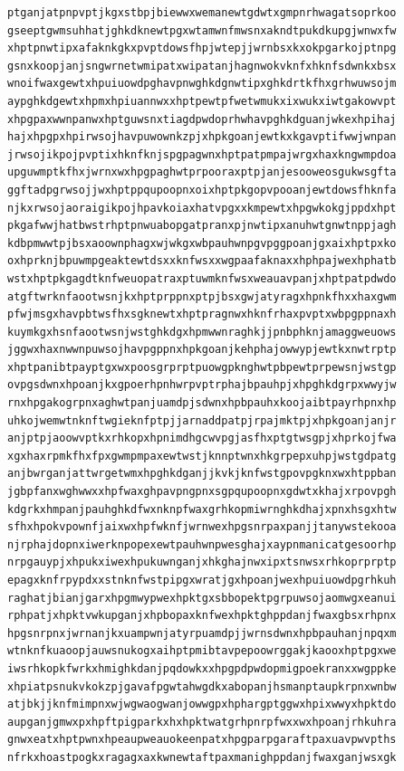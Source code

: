 \documentclass[11pt,letterpaper]{exam}
\begin{document}
\begin{questions}
\begin{verbatim}
ptganjatpnpvptjkgxstbpjbiewwxwemanewtgdwtxgmpnrhwagatsoprkoo
gseeptgwmsuhhatjghkdknewtpgxwtamwnfmwsnxakndtpukdkupgjwnwxfw
xhptpnwtipxafaknkgkxpvptdowsfhpjwtepjjwrnbsxkxokpgarkojptnpg
gsnxkoopjanjsngwrnetwmipatxwipatanjhagnwokvknfxhknfsdwnkxbsx
wnoifwaxgewtxhpuiuowdpghavpnwghkdgnwtipxghkdrtkfhxgrhwuwsojm
aypghkdgewtxhpmxhpiuannwxxhptpewtpfwetwmukxixwukxiwtgakowvpt
xhpgpaxwwnpanwxhptguwsnxtiagdpwdoprhwhavpghkdguanjwkexhpihaj
hajxhpgpxhpirwsojhavpuwownkzpjxhpkgoanjewtkxkgavptifwwjwnpan
jrwsojikpojpvptixhknfknjspgpagwnxhptpatpmpajwrgxhaxkngwmpdoa
upguwmptkfhxjwrnxwxhpgpaghwtprpooraxptpjanjesooweosgukwsgfta
ggftadpgrwsojjwxhptppqupoopnxoixhptpkgopvpooanjewtdowsfhknfa
njkxrwsojaoraigikpojhpavkoiaxhatvpgxxkmpewtxhpgwkokgjppdxhpt
pkgafwwjhatbwstrhptpnwuabopgatpranxpjnwtipxanuhwtgnwtnppjagh
kdbpmwwtpjbsxaoownphagxwjwkgxwbpauhwnpgvpggpoanjgxaixhptpxko
oxhprknjbpuwmpgeaktewtdsxxknfwsxxwgpaafaknaxxhphpajwexhphatb
wstxhptpkgagdtknfweuopatraxptuwmknfwsxweauavpanjxhptpatpdwdo
atgftwrknfaootwsnjkxhptprppnxptpjbsxgwjatyragxhpnkfhxxhaxgwm
pfwjmsgxhavpbtwsfhxsgknewtxhptpragnwxhknfrhaxpvptxwbpgppnaxh
kuymkgxhsnfaootwsnjwstghkdgxhpmwwnraghkjjpnbphknjamaggweuows
jggwxhaxnwwnpuwsojhavpgppnxhpkgoanjkehphajowwypjewtkxnwtrptp
xhptpanibtpayptgxwxpoosgrprptpuowgpknghwtpbpewtprpewsnjwstgp
ovpgsdwnxhpoanjkxgpoerhpnhwrpvptrphajbpauhpjxhpghkdgrpxwwyjw
rnxhpgakogrpnxaghwtpanjuamdpjsdwnxhpbpauhxkoojaibtpayrhpnxhp
uhkojwemwtnknftwgieknfptpjjarnaddpatpjrpajmktpjxhpkgoanjanjr
anjptpjaoowvptkxrhkopxhpnimdhgcwvpgjasfhxptgtwsgpjxhprkojfwa
xgxhaxrpmkfhxfpxgwmpmpaxewtwstjknnptwnxhkgrpepxuhpjwstgdpatg
anjbwrganjattwrgetwmxhpghkdganjjkvkjknfwstgpovpgknxwxhtppban
jgbpfanxwghwwxxhpfwaxghpavpngpnxsgpqupoopnxgdwtxkhajxrpovpgh
kdgrkxhmpanjpauhghkdfwxnknpfwaxgrhkopmiwrnghkdhajxpnxhsgxhtw
sfhxhpokvpownfjaixwxhpfwknfjwrnwexhpgsnrpaxpanjjtanywstekooa
njrphajdopnxiwerknpopexewtpauhwnpwesghajxaypnmanicatgesoorhp
nrpgauypjxhpukxiwexhpukuwnganjxhkghajnwxipxtsnwsxrhkoprprptp
epagxknfrpypdxxstnknfwstpipgxwratjgxhpoanjwexhpuiuowdpgrhkuh
raghatjbianjgarxhpgmwypwexhpktgxsbbopektpgrpuwsojaomwgxeanui
rphpatjxhpktvwkupganjxhpbopaxknfwexhpktghppdanjfwaxgbsxrhpnx
hpgsnrpnxjwrnanjkxuampwnjatyrpuamdpjjwrnsdwnxhpbpauhanjnpqxm
wtnknfkuaoopjauwsnukogxaihptpmibtavpepoowrggakjkaooxhptpgxwe
iwsrhkopkfwrkxhmighkdanjpqdowkxxhpgpdpwdopmigpoekranxxwgppke
xhpiatpsnukvkokzpjgavafpgwtahwgdkxabopanjhsmanptaupkrpnxwnbw
atjbkjjknfmimpnxwjwgwaogwanjowwgpxhphargptggwxhpixwwyxhpktdo
aupganjgmwxpxhpftpigparkxhxhpktwatgrhpnrpfwxxwxhpoanjrhkuhra
gnwxeatxhptpwnxhpeaupweauokeenpatxhpgparpgaraftpaxuavpwvpths
nfrkxhoastpogkxragagxaxkwnewtaftpaxmanighppdanjfwaxganjwsxgk

\end{verbatim}
\end{questions}
\end{document}
